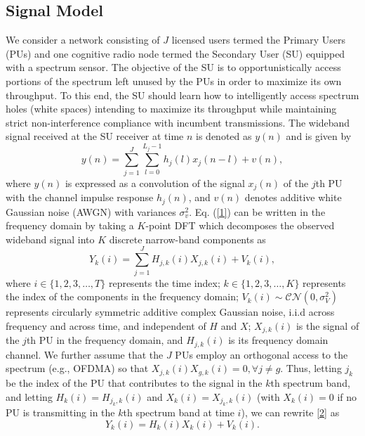 \documentclass[10pt,twocolumn]{IEEEtran}
\begin{document}
\subsection{Signal Model}\label{A}
We consider a network consisting of $J$ licensed users termed the Primary Users (PUs) and one cognitive radio node termed the Secondary User (SU) equipped with a spectrum sensor. The objective of the SU is to opportunistically access portions of the spectrum left unused by the PUs in order to maximize its own throughput. To this end, the SU should learn how to intelligently access spectrum holes (white spaces) intending to maximize its throughput while maintaining strict non-interference compliance with incumbent transmissions.
The wideband signal received at the SU receiver at time $n$ is denoted as $y(n)$ and is given by 
\begin{equation}\label{1}
    y(n) = \sum_{j=1}^{J} \sum_{l=0}^{L_{j}-1} h_{j}(l)x_{j}(n-l) + v(n),
\end{equation}
where $y(n)$ is expressed as a convolution of the signal $x_{j}(n)$ of the $j$th PU with the channel impulse response $h_{j}(n)$, and $v(n)$ denotes additive white Gaussian noise (AWGN) with variances $\sigma_v^2$. Eq. (\ref{1}) can be written in the frequency domain by taking a $K$-point DFT which decomposes the observed wideband signal into $K$ discrete narrow-band components as 
\begin{equation}\label{2}
    Y_k(i) = \sum_{j=1}^{J} H_{j,k}(i)X_{j,k}(i) + V_k(i),
\end{equation}
where $i {\in} \{1,2,3,\dots,T\}$ represents the time index; $k {\in} \{1,2,3,\dots,K\}$ represents the index of the components in the frequency domain; $V_k(i) {\sim} \mathcal{CN}(0,\sigma_V^2)$ represents circularly symmetric additive complex Gaussian noise, i.i.d across frequency and across time, and independent of $H$ and $X$; $X_{j,k}(i)$ is the signal of the $j$th PU in the frequency domain, and $H_{j,k}(i)$ is its frequency domain channel. We further assume that the $J$ PUs employ an orthogonal access to the spectrum (e.g., OFDMA) so that $X_{j,k}(i)X_{g,k}(i)=0, \forall j{\neq}g$. Thus, letting $j_{k}$ be the index of the PU that contributes to the signal in the $k$th spectrum band, and letting  $H_{k}(i){=}H_{j_{k},k}(i)$ and $X_{k}(i){=}X_{j_{k},k}(i)$ (with $X_{k}(i){=}0$ if no PU is transmitting in the $k$th spectrum band at time $i$), we can rewrite \eqref{2} as 
\begin{equation}\label{3}
    Y_k(i) = H_{k}(i)X_{k}(i) + V_k(i).
\end{equation}
\end{document}
